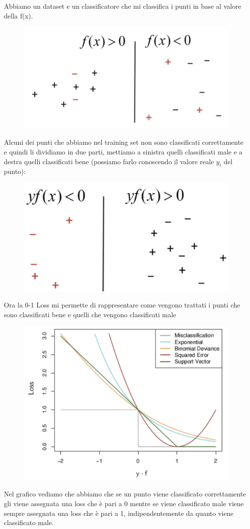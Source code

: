 \documentclass[14pt]{extreport}
\begin{document}
Abbiamo un dataset e un classificatore che mi classifica i punti in base al valore della f(x).
\begin{figure}[H]
	\centering
	\includegraphics[width=0.5\linewidth]{330.jpeg}
\end{figure}

Alcuni dei punti che abbiamo nel training set non sono classificati correttamente e quindi li dividiamo in due parti, mettiamo a sinistra quelli
classificati male e a destra quelli classificati bene (possiamo farlo conoscendo il valore reale $y_i$ del punto):

\begin{figure}[H]
	\centering
	\includegraphics[width=0.5\linewidth]{329.jpeg}
\end{figure}

Ora la 0-1 Loss mi permette di rappresentare come vengono trattati i punti che sono classificati bene e quelli che vengono classificati male

\begin{figure}[H]
	\centering
	\includegraphics[width=0.5\linewidth]{331.jpeg}
\end{figure}

Nel grafico vediamo che abbiamo che se un punto viene classificato correttamente gli viene assegnata una loss che è pari a 0 mentre se viene
classificato male viene sempre assegnata una loss che è pari a 1, indipendentemente da quanto viene classificato male.
\end{document}
